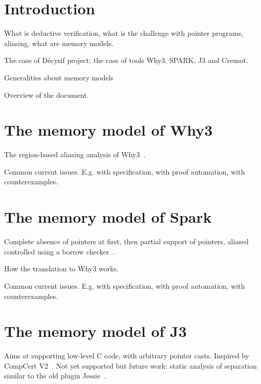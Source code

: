 \documentclass[a4paper,twoside]{article}
\begin{document}
\sloppy{}
\makeRR   %


\tableofcontents
\clearpage

\listoffigures

\clearpage

\section{Introduction}

What is deductive verification, what is the challenge with pointer programs, aliasing,
what are memory models.

The case of Décysif project: the case of tools Why3, SPARK, J3 and Creusot.

Generalities about memory models

Overview of the document.

\section{The memory model of Why3}

The region-based aliasing analysis of Why3~\cite{gondelman16reg}.

Common current issues. E.g. with specification, with proof automation, with
counterexamples.

\section{The memory model of Spark}

Complete absence of pointers at first, then partial support of pointers, aliased
controlled using a borrow checker~\cite{dross20cav,jaloyan20icfem}.

How the translation to Why3 works.

Common current issues. E.g. with specification, with proof automation, with
counterexamples.

\section{The memory model of J3}

Aims at supporting low-level C code, with arbitrary pointer casts. Inspired by
CompCert V2~\cite{leroy12rr}. Not yet supported but future work: static analysis
of separation similar to the old plugin
Jessie~\cite{hubert2008these,hubert07hav}.
\end{document}
